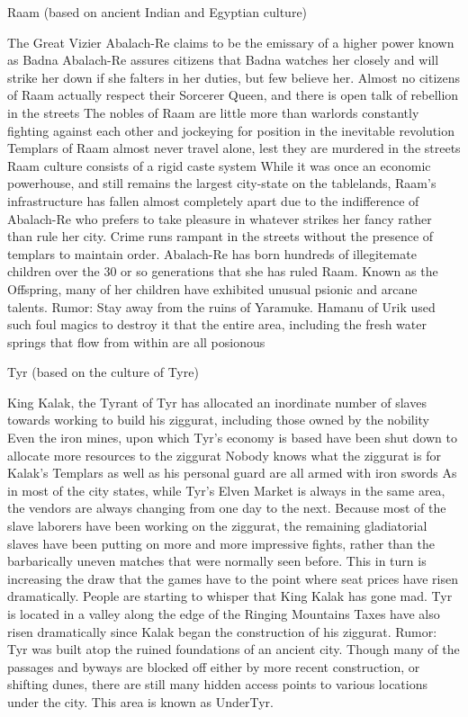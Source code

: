 Raam (based on ancient Indian and Egyptian culture)

    The Great Vizier Abalach-Re claims to be the emissary of a higher power known as Badna
    Abalach-Re assures citizens that Badna watches her closely and will strike her down if she falters in her duties, but few believe her.
    Almost no citizens of Raam actually respect their Sorcerer Queen, and there is open talk of rebellion in the streets
    The nobles of Raam are little more than warlords constantly fighting against each other and jockeying for position in the inevitable revolution
    Templars of Raam almost never travel alone, lest they are murdered in the streets
    Raam culture consists of a rigid caste system
    While it was once an economic powerhouse, and still remains the largest city-state on the tablelands, Raam’s infrastructure has fallen almost completely apart due to the indifference of Abalach-Re who prefers to take pleasure in whatever strikes her fancy rather than rule her city.
    Crime runs rampant in the streets without the presence of templars to maintain order.
    Abalach-Re has born hundreds of illegitemate children over the 30 or so generations that she has ruled Raam. Known as the Offspring, many of her children have exhibited unusual psionic and arcane talents.
    Rumor: Stay away from the ruins of Yaramuke. Hamanu of Urik used such foul magics to destroy it that the entire area, including the fresh water springs that flow from within are all posionous

Tyr (based on the culture of Tyre)

    King Kalak, the Tyrant of Tyr has allocated an inordinate number of slaves towards working to build his ziggurat, including those owned by the nobility
    Even the iron mines, upon which Tyr’s economy is based have been shut down to allocate more resources to the ziggurat
    Nobody knows what the ziggurat is for
    Kalak’s Templars as well as his personal guard are all armed with iron swords
    As in most of the city states, while Tyr’s Elven Market is always in the same area, the vendors are always changing from one day to the next.
    Because most of the slave laborers have been working on the ziggurat, the remaining gladiatorial slaves have been putting on more and more impressive fights, rather than the barbarically uneven matches that were normally seen before. This in turn is increasing the draw that the games have to the point where seat prices have risen dramatically.
    People are starting to whisper that King Kalak has gone mad.
    Tyr is located in a valley along the edge of the Ringing Mountains
    Taxes have also risen dramatically since Kalak began the construction of his ziggurat.
    Rumor: Tyr was built atop the ruined foundations of an ancient city. Though many of the passages and byways are blocked off either by more recent construction, or shifting dunes, there are still many hidden access points to various locations under the city. This area is known as UnderTyr.

